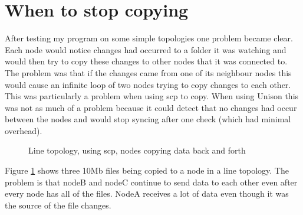 \documentclass[12pt]{article}
\begin{document}
\section{When to stop copying}
After testing my program on some simple topologies one problem became
clear. Each node would notice changes had occurred to a folder
it was watching and would then try to copy these changes to other
nodes that it was connected to. The problem was that if the changes
came from one of its neighbour nodes this would cause an infinite loop
of two nodes trying to copy changes to each other. This was particularly 
a problem when using scp to copy. When using Unison this was not as much of
a problem because it could detect that no changes had occur between the nodes
and would stop syncing after one check (which had minimal overhead).

\begin{figure}[htp]
    \caption{Line topology, using scp, nodes copying data back and forth}
    \label{fig:line_scp_back_forth_graph}
\end{figure}

Figure \ref{fig:line_scp_back_forth_graph} shows three 10Mb files being copied to a node
in a line topology. The problem is that nodeB and nodeC continue to send
data to each other even after every node has all of the files. NodeA receives
a lot of data even though it was the source of the file changes. 
\end{document}
